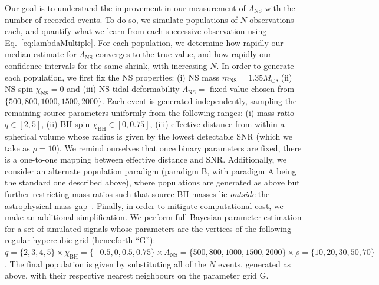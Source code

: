 \documentclass[aps,prd,amsmath,floats,floatfix, twocolumn,
superscriptaddress,nofootinbib,showpacs]{revtex4-1}
\newcommand{\lambdans}{\Lambda_\mathrm{NS}}
\newcommand{\chibh}{\chi_\mathrm{BH}}
\newcommand{\chins}{\chi_\mathrm{NS}}
\newcommand{\mns}{m_\mathrm{NS}}
\begin{document}
Our goal is to understand the improvement in our measurement of $\lambdans$
with the number of recorded events. To do so, we simulate populations of $N$
observations each, and quantify what we learn from each successive observation 
using Eq.~\ref{eq:lambdaMultiple}. For each population, we determine how
rapidly our median estimate for $\lambdans$ converges to the true value,
and how rapidly our confidence intervals for the same shrink, with increasing
$N$. In order to generate each population, we first fix
the NS properties: (i) NS mass $\mns=1.35M_\odot$, (ii) NS spin $\chins=0$
and (iii) NS tidal deformability $\lambdans=$ fixed value chosen from
$\{500,800,1000,1500,2000\}$. Each event is generated independently, sampling
the remaining source parameters uniformly from the following ranges: (i)
mass-ratio $q\in[2,5]$, (ii) BH spin $\chibh\in[0, 0.75]$, (iii) effective 
distance from within a spherical volume whose radius is given by the lowest 
detectable SNR (which we take as $\rho=10$). We remind ourselves that
once binary parameters are fixed, there is a one-to-one mapping between
effective distance and SNR. Additionally, we consider an alternate population
paradigm (paradigm B, with paradigm A being the standard one described 
above), where populations are generated as above but further restricting
mass-ratios such that source BH masses lie {\it outside} the astrophysical 
mass-gap~\cite{Bailyn:1997xt,Kalogera:1996ci,Kreidberg:2012,Littenberg:2015tpa}.
Finally, in order to mitigate computational cost, we make an additional 
simplification. We perform full Bayesian parameter estimation for a set of 
simulated signals whose parameters are the vertices of the following regular
hypercubic grid (henceforth ``G''):
$q=\{2,3,4,5\}\times\chibh=\{-0.5,0,0.5,0.75\}\times\lambdans=\{500,800,1000,1500,2000\}\times\rho=\{10,20,30,50,70\}$.
The final population is given by substituting all of the $N$ events, generated
as above, with their respective nearest neighbours on the parameter grid G.
\end{document}
